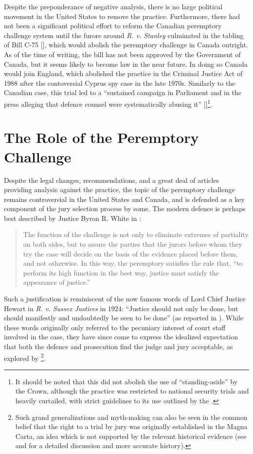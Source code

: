 Despite the preponderance of negative analysis, there is no large political movement in the United States to remove the
practice. Furthermore, there had not been a significant political effort to reform the Canadian peremptory challenge system until the
furore around \textit{R. v. Stanley} culminated in the tabling of Bill C-75 [\cite{c75legisinfo}], which would abolish the peremptory
challenge in Canada outright. As of the time of writing, the bill has not been approved by the Government of Canada, but it seems
likely to become law in the near future. In doing so Canada would join England, which abolished the practice in the Criminal
Justice Act of 1988 after the contoversial Cyprus spy case in the late
1970s. Similarly to the Canadian case, this trial led to a ``sustained campaign in Parliament
and in the press alleging that defence counsel were systematically abusing it'' [\cite{hoffman1997}]\footnote{It should be noted
  that this did not abolish the use of ``standing-aside'' by the Crown, although the practice was restricted to national security
  trials and heavily curtailed, with strict guidelines to its use
  outlined by the \cite{attgenguide}.}.

\section{The Role of the Peremptory Challenge} \label{sec:roleper}

Despite the legal changes, recommendations, and a great deal of articles providing analysis against the practice, the topic of the peremptory challenge remains controversial in the United States and Canada, and is
defended as a key component of the jury selection process by some. The modern defence is perhaps best described by Justice Byron
R. White in \cite{swainvalabama}:

\begin{quote}
The function of the challenge is not only to eliminate extremes of partiality on both sides, but to assure the parties that the
jurors before whom they try the case will decide on the basis of the evidence placed before them, and not otherwise. In this way,
the peremptory satisfies the rule that, ``to perform its high function in the best way, justice must satisfy the appearance of
justice.''
\end{quote}

Such a justification is reminiscent of the now famous words of Lord Chief Justice Hewart in \textit{R. v. Sussex Justices} in 1924:
``Justice should not only be done, but should manifestly and undoubtedly be seen to be done'' (as reported in
\cite{oakes2016}). While these words originally only referred to the pecuniary interest of court staff involved in the case, they
have since come to express the idealized expectation that both the defence and prosecution find the judge and jury acceptable, as
explored by \cite{oakes2016}\footnote{Such grand generalizations and myth-making can also be seen in the common belief that the
  right to a trial by jury was originally established in the Magna Carta, an idea which is not supported by the relevant
  historical evidence (see \cite{hoffman1997} and \cite{vandykejurysel} for a detailed discussion and more accurate history).}.

